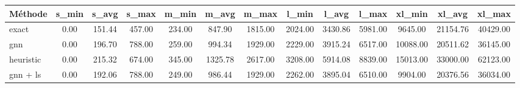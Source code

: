 \begin{tabular}{lcccccccccccc}
\toprule
Méthode & s_min & s_avg & s_max & m_min & m_avg & m_max & l_min & l_avg & l_max & xl_min & xl_avg & xl_max \\
\midrule
exact & 0.00 & 151.44 & 457.00 & 234.00 & 847.90 & 1815.00 & 2024.00 & 3430.86 & 5981.00 & 9645.00 & 21154.76 & 40429.00 \\
gnn & 0.00 & 196.70 & 788.00 & 259.00 & 994.34 & 1929.00 & 2229.00 & 3915.24 & 6517.00 & 10088.00 & 20511.62 & 36145.00 \\
heuristic & 0.00 & 215.32 & 674.00 & 345.00 & 1325.78 & 2617.00 & 3208.00 & 5914.08 & 8839.00 & 15013.00 & 33000.00 & 62123.00 \\
gnn + ls & 0.00 & 192.06 & 788.00 & 249.00 & 986.44 & 1929.00 & 2262.00 & 3895.04 & 6510.00 & 9904.00 & 20376.56 & 36034.00 \\
\bottomrule
\end{tabular}
